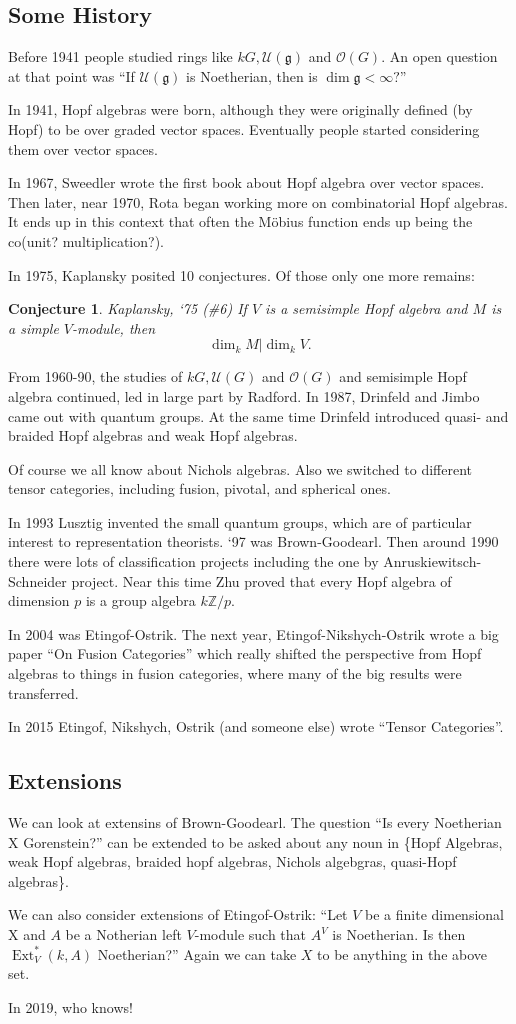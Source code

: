 \documentclass[12pt]{article}
\theoremstyle{break}
\theoremstyle{nonumberbreak}
\theoremstyle{changebreak}
\theoremstyle{break}
\theoremstyle{nonumberbreak}
\theoremstyle{nonumberplain}
\newtheorem{conj}{Conjecture}
\theoremstyle{change}
\newcommand*{\Z}{
\mathbb{Z}
}
\DeclareMathOperator{\Ext}{Ext}
\newcommand*{\g}{\mathfrak{g}}
\begin{document}
\subsection{Some History}
Before 1941 people studied rings like $kG, \mathcal U(\g)$ and $\mathcal O(G)$. An open question at that
point was ``If $\mathcal U(\g)$ is Noetherian, then is $\dim \g<\infty?$''

In 1941, Hopf algebras were born, although they were originally defined (by Hopf) to be over graded
vector spaces. Eventually people started considering them over vector spaces.

In 1967, Sweedler wrote the first book about Hopf algebra over vector spaces. Then later, near 1970,
Rota began working more on combinatorial Hopf algebras. It ends up in this context that often the 
M\"obius function ends up being the co(unit? multiplication?).

In 1975, Kaplansky posited 10 conjectures. Of those only one more remains:
\begin{conj}{Kaplansky, `75 (\#6)}
	If $V$ is a semisimple Hopf algebra and $M$ is a simple $V$-module, then 
	\[\dim_kM|\dim_kV.\]
\end{conj}

From 1960-90, the studies of $kG, \mathcal U(G)$ and $\mathcal O(G)$ and semisimple Hopf algebra continued,
led in large part by Radford. In 1987, Drinfeld and Jimbo came out with quantum groups.
At the same time Drinfeld introduced quasi- and braided Hopf algebras and weak Hopf algebras.

Of course we all know about Nichols algebras. Also we switched to different tensor categories, including
fusion, pivotal, and spherical ones.

In 1993 Lusztig invented the small quantum groups, which are of particular interest to representation theorists.
`97 was Brown-Goodearl. Then around 1990 there were lots of classification projects including
the one by Anruskiewitsch-Schneider project. Near this time Zhu proved that every Hopf algebra of dimension $p$
is a group algebra $k\Z/p$. 

In 2004 was Etingof-Ostrik. The next year, Etingof-Nikshych-Ostrik wrote a big paper ``On Fusion Categories''
which really shifted the perspective from Hopf algebras to things in fusion categories, where many of the big
results were transferred.

In 2015 Etingof, Nikshych, Ostrik (and someone else) wrote ``Tensor Categories''.

\subsection{Extensions}
We can look at extensins of Brown-Goodearl. The question ``Is every Noetherian X Gorenstein?'' can be extended to be asked about any noun 
in \{Hopf Algebras, weak Hopf algebras, braided hopf algebras, Nichols algebgras, quasi-Hopf algebras\}.

We can also consider extensions of Etingof-Ostrik: ``Let $V$ be a finite dimensional X and $A$ be a 
Notherian left $V$-module such that $A^V$ is Noetherian. Is then $\Ext_V^*(k,A)$ Noetherian?'' Again
we can take $X$ to be anything in the above set.

In 2019, who knows!
\end{document}
